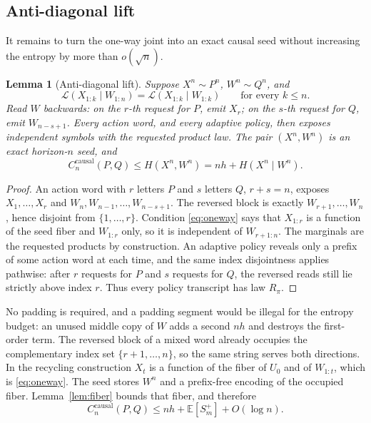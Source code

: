 \documentclass[11pt]{article}
\newtheorem{lemma}[theorem]{Lemma}
\theoremstyle{definition}
\newcommand{\causal}{\mathrm{causal}}
\newcommand{\E}{\mathbb{E}}
\begin{document}
\subsection{Anti-diagonal lift}

It remains to turn the one-way joint into an exact causal seed without increasing the entropy by more than \(o(\sqrt{n})\).

\begin{lemma}[Anti-diagonal lift]
\label{lem:lift}
Suppose \(X^n\sim P^n\), \(W^n\sim Q^n\), and
\begin{equation}
  \label{eq:oneway}
  \mathcal L(X_{1:k}\mid W_{1:n})
  =
  \mathcal L(X_{1:k}\mid W_{1:k})
  \qquad\text{for every }k\le n.
\end{equation}
Read \(W\) backwards: on the \(r\)-th request for \(P\), emit \(X_r\); on the \(s\)-th request for \(Q\), emit \(W_{n-s+1}\).
Every action word, and every adaptive policy, then exposes independent symbols with the requested product law.
The pair \((X^n,W^n)\) is an exact horizon-\(n\) seed, and
\[
  C_n^{\causal}(P,Q)
  \le
  H(X^n,W^n)
  =
  nh+H(X^n\mid W^n).
\]
\end{lemma}

\begin{proof}
An action word with \(r\) letters \(P\) and \(s\) letters \(Q\), \(r+s=n\), exposes \(X_1,\ldots,X_r\) and \(W_n,W_{n-1},\ldots,W_{n-s+1}\).
The reversed block is exactly \(W_{r+1},\ldots,W_n\), hence disjoint from \(\{1,\ldots,r\}\).
Condition \eqref{eq:oneway} says that \(X_{1:r}\) is a function of the seed fiber and \(W_{1:r}\) only, so it is independent of \(W_{r+1:n}\).
The marginals are the requested products by construction.
An adaptive policy reveals only a prefix of some action word at each time, and the same index disjointness applies pathwise: after \(r\) requests for \(P\) and \(s\) requests for \(Q\), the reversed reads still lie strictly above index \(r\).
Thus every policy transcript has law \(R_\pi\).
\end{proof}

No padding is required, and a padding segment would be illegal for the entropy budget: an unused middle copy of \(W\) adds a second \(nh\) and destroys the first-order term.
The reversed block of a mixed word already occupies the complementary index set \(\{r+1,\ldots,n\}\), so the same string serves both directions.
In the recycling construction \(X_t\) is a function of the fiber of \(U_0\) and of \(W_{1:t}\), which is \eqref{eq:oneway}.
The seed stores \(W^n\) and a prefix-free encoding of the occupied fiber.
Lemma~\ref{lem:fiber} bounds that fiber, and therefore
\[
  C_n^{\causal}(P,Q)
  \le
  nh+\E[S_m^+]+O(\log n).
\]
\end{document}
